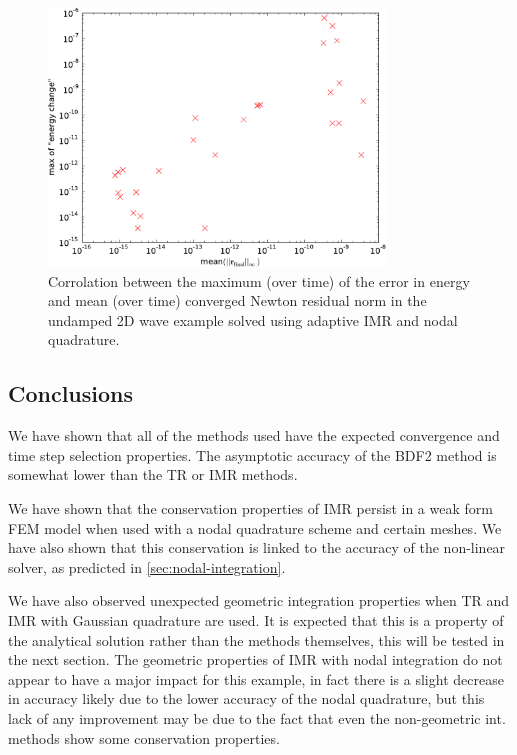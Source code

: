 \begin{figure}
  \centering
  \includegraphics[width=0.8\textwidth]
  {plots/2d_wave_solution_energy_newton_res/maxofenergychangevsmeanminofnewtonresiduals.pdf}
  \caption{Corrolation between the maximum (over time) of the error in energy and mean (over time) converged Newton residual norm in the undamped 2D wave example solved using adaptive IMR and nodal quadrature.}
  \label{fig:energy-error-2d-nodal-newton-tests}
\end{figure}



\subsection{Conclusions}

We have shown that all of the methods used have the expected convergence and time step selection properties.
The asymptotic accuracy of the BDF2 method is somewhat lower than the TR or IMR methods.

We have shown that the conservation properties of IMR persist in a weak form FEM model when used with a nodal quadrature scheme and certain meshes.
We have also shown that this conservation is linked to the accuracy of the non-linear solver, as predicted in \cref{sec:nodal-integration}.

We have also observed unexpected geometric integration properties when TR and IMR with Gaussian quadrature are used.
It is expected that this is a property of the analytical solution rather than the methods themselves, this will be tested in the next section.
The geometric properties of IMR with nodal integration do not appear to have a major impact for this example, in fact there is a slight decrease in accuracy likely due to the lower accuracy of the nodal quadrature, but this lack of any improvement may be due to the fact that even the non-geometric int. methods show some conservation properties.



